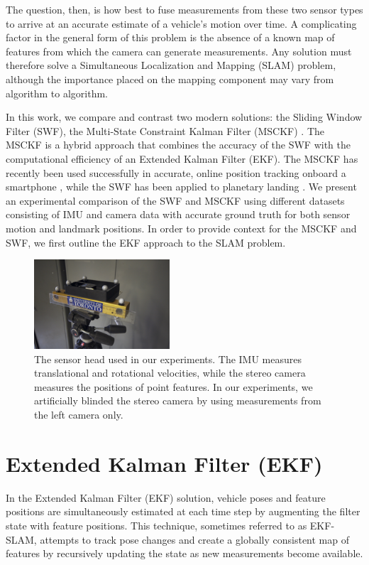 \documentclass[letterpaper, 10 pt, conference]{ieeeconf}  %
\begin{document}
The question, then, is how best to fuse measurements from these two sensor types to arrive at an accurate estimate of a vehicle's motion over time.
A complicating factor in the general form of this problem is the absence of a known map of features from which the camera can generate measurements.
Any solution must therefore solve a Simultaneous Localization and Mapping (SLAM) problem, although the importance placed on the mapping component may vary from algorithm to algorithm.

In this work, we compare and contrast two modern solutions: the Sliding Window Filter (SWF), the Multi-State Constraint Kalman Filter (MSCKF) \cite{Mourikis:2006:TechReport,Mourikis:2007:ICRA}.
The MSCKF is a hybrid approach that combines the accuracy of the SWF with the computational efficiency of an Extended Kalman Filter (EKF).
The MSCKF has recently been used successfully in accurate, online position tracking onboard a smartphone \cite{Li:2013:ICRA}, while the SWF has been applied to planetary landing \cite{Sibley:2010:JFR}.
We present an experimental comparison of the SWF and MSCKF using different datasets consisting of IMU and camera data with accurate ground truth for both sensor motion and landmark positions.
In order to provide context for the MSCKF and SWF, we first outline the EKF approach to the SLAM problem.

\begin{figure}
    \centering
    \includegraphics[width=0.45\textwidth]{figs/sensorhead}
    \caption{The sensor head used in our experiments. The IMU measures translational and rotational velocities, while the stereo camera measures the positions of point features. In our experiments, we artificially blinded the stereo camera by using measurements from the left camera only.}
    \label{fig:sensorhead}
\end{figure}

\section{Extended Kalman Filter (EKF)} \label{sec:EKF}
In the Extended Kalman Filter (EKF) solution, vehicle poses and feature positions are simultaneously estimated at each time step by augmenting the filter state with feature positions.
This technique, sometimes referred to as EKF-SLAM, attempts to track pose changes and create a globally consistent map of features by recursively updating the state as new measurements become available.
\end{document}
